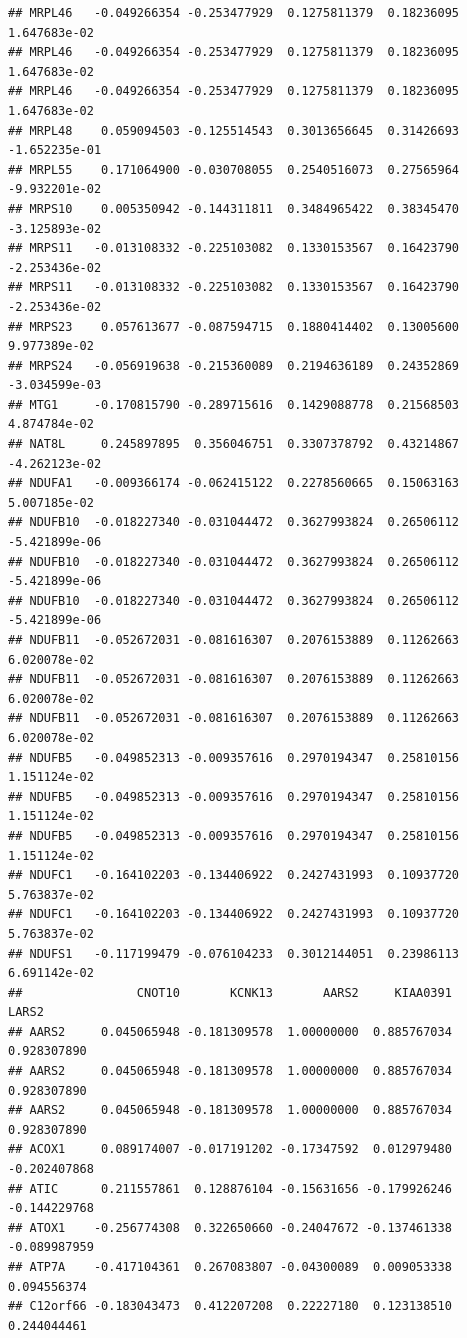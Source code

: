 \documentclass[
]{article}
\begin{document}
\begin{verbatim}
## MRPL46   -0.049266354 -0.253477929  0.1275811379  0.18236095  1.647683e-02
## MRPL46   -0.049266354 -0.253477929  0.1275811379  0.18236095  1.647683e-02
## MRPL46   -0.049266354 -0.253477929  0.1275811379  0.18236095  1.647683e-02
## MRPL48    0.059094503 -0.125514543  0.3013656645  0.31426693 -1.652235e-01
## MRPL55    0.171064900 -0.030708055  0.2540516073  0.27565964 -9.932201e-02
## MRPS10    0.005350942 -0.144311811  0.3484965422  0.38345470 -3.125893e-02
## MRPS11   -0.013108332 -0.225103082  0.1330153567  0.16423790 -2.253436e-02
## MRPS11   -0.013108332 -0.225103082  0.1330153567  0.16423790 -2.253436e-02
## MRPS23    0.057613677 -0.087594715  0.1880414402  0.13005600  9.977389e-02
## MRPS24   -0.056919638 -0.215360089  0.2194636189  0.24352869 -3.034599e-03
## MTG1     -0.170815790 -0.289715616  0.1429088778  0.21568503  4.874784e-02
## NAT8L     0.245897895  0.356046751  0.3307378792  0.43214867 -4.262123e-02
## NDUFA1   -0.009366174 -0.062415122  0.2278560665  0.15063163  5.007185e-02
## NDUFB10  -0.018227340 -0.031044472  0.3627993824  0.26506112 -5.421899e-06
## NDUFB10  -0.018227340 -0.031044472  0.3627993824  0.26506112 -5.421899e-06
## NDUFB10  -0.018227340 -0.031044472  0.3627993824  0.26506112 -5.421899e-06
## NDUFB11  -0.052672031 -0.081616307  0.2076153889  0.11262663  6.020078e-02
## NDUFB11  -0.052672031 -0.081616307  0.2076153889  0.11262663  6.020078e-02
## NDUFB11  -0.052672031 -0.081616307  0.2076153889  0.11262663  6.020078e-02
## NDUFB5   -0.049852313 -0.009357616  0.2970194347  0.25810156  1.151124e-02
## NDUFB5   -0.049852313 -0.009357616  0.2970194347  0.25810156  1.151124e-02
## NDUFB5   -0.049852313 -0.009357616  0.2970194347  0.25810156  1.151124e-02
## NDUFC1   -0.164102203 -0.134406922  0.2427431993  0.10937720  5.763837e-02
## NDUFC1   -0.164102203 -0.134406922  0.2427431993  0.10937720  5.763837e-02
## NDUFS1   -0.117199479 -0.076104233  0.3012144051  0.23986113  6.691142e-02
##                CNOT10       KCNK13       AARS2     KIAA0391        LARS2
## AARS2     0.045065948 -0.181309578  1.00000000  0.885767034  0.928307890
## AARS2     0.045065948 -0.181309578  1.00000000  0.885767034  0.928307890
## AARS2     0.045065948 -0.181309578  1.00000000  0.885767034  0.928307890
## ACOX1     0.089174007 -0.017191202 -0.17347592  0.012979480 -0.202407868
## ATIC      0.211557861  0.128876104 -0.15631656 -0.179926246 -0.144229768
## ATOX1    -0.256774308  0.322650660 -0.24047672 -0.137461338 -0.089987959
## ATP7A    -0.417104361  0.267083807 -0.04300089  0.009053338  0.094556374
## C12orf66 -0.183043473  0.412207208  0.22227180  0.123138510  0.244044461

\end{verbatim}
\end{document}
